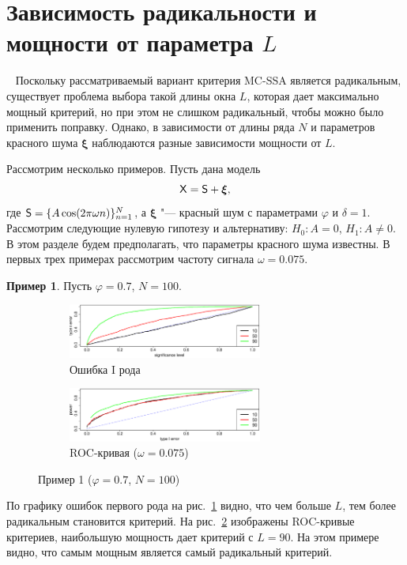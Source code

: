 \documentclass[specialist,
substylefile = spbu_report.rtx,
subf,href,colorlinks=true, 12pt]{disser}
\theoremstyle{definition}
\newtheorem{example}{Пример}
\newcommand{\bfxi}{\boldsymbol{\xi}}
\begin{document}

\section{Зависимость радикальности и мощности от параметра $L$}~\label{sect:cps2024}
Поскольку рассматриваемый вариант критерия MC-SSA является радикальным, существует проблема выбора такой длины окна $L$, которая дает максимально мощный критерий, но при этом не слишком радикальный, чтобы можно было применить поправку. Однако, в зависимости от длины ряда $N$ и параметров красного шума $\bfxi$ наблюдаются разные зависимости мощности от $L$.

Рассмотрим несколько примеров. Пусть дана модель
\[
    \mathsf{X}=\mathsf{S}+{\boldsymbol\xi},
\]
где $\mathsf{S}=\{A\cos(2\pi\omega n)\}_{n=1}^N$, а ${\boldsymbol\xi}$ "--- красный шум с параметрами $\varphi$ и $\delta=1$. Рассмотрим следующие нулевую гипотезу и альтернативу: $H_0:A=0$, $H_1:A\ne0$. В этом разделе будем предполагать, что параметры красного шума известны. В первых трех примерах рассмотрим частоту сигнала $\omega = 0.075$.

\begin{example}\label{example1}
	Пусть $\varphi=0.7$, $N=100$.
	\begin{figure}[h!]
		\captionsetup[subfigure]{justification=Centering}
		\begin{subfigure}[t]{\textwidth}
			\centering
			\includegraphics[width=0.7\textwidth]{../cps2024/images/alphaI_phi7_N100.eps}
			\caption{Ошибка I рода}
			\label{alphaI_phi7_N100}
		\end{subfigure}
		\begin{subfigure}[t]{\textwidth}
			\centering
			\includegraphics[width=0.7\textwidth]{../cps2024/images/roc_phi7_N100.eps}
			\caption{ROC-кривая ($\omega=0.075$)}
			\label{roc_phi7_N100}
		\end{subfigure}
	\label{fig:example1}
	\caption{Пример 1 ($\varphi=0.7$, $N=100$)}
	\end{figure}
	По графику ошибок первого рода на рис.~\ref{alphaI_phi7_N100} видно, что чем больше $L$, тем более радикальным становится критерий. На рис.~\ref{roc_phi7_N100} изображены ROC-кривые критериев, наибольшую мощность дает критерий с $L=90$. На этом примере видно, что самым мощным является самый радикальный критерий. 
\end{example}
\end{document}
